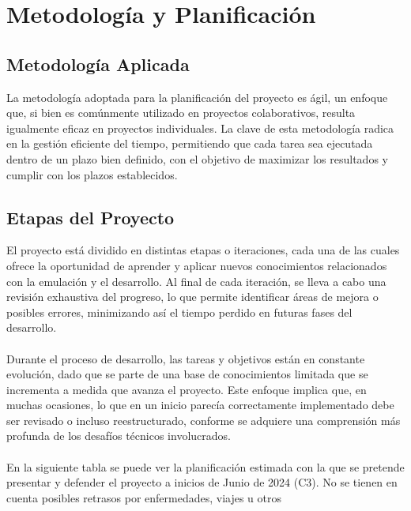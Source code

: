 \cleardoublepage

\chapter{Metodología y Planificación}
\label{planificacion}
\section{Metodología Aplicada}
La metodología adoptada para la planificación del proyecto es ágil, un enfoque que, si bien es comúnmente utilizado en proyectos colaborativos, resulta igualmente eficaz en proyectos individuales. La clave de esta metodología radica en la gestión eficiente del tiempo, permitiendo que cada tarea sea ejecutada dentro de un plazo bien definido, con el objetivo de maximizar los resultados y cumplir con los plazos establecidos.
\section{Etapas del Proyecto}
El proyecto está dividido en distintas etapas o iteraciones, cada una de las cuales ofrece la oportunidad de aprender y aplicar nuevos conocimientos relacionados con la emulación y el desarrollo. Al final de cada iteración, se lleva a cabo una revisión exhaustiva del progreso, lo que permite identificar áreas de mejora o posibles errores, minimizando así el tiempo perdido en futuras fases del desarrollo.
\\\\
Durante el proceso de desarrollo, las tareas y objetivos están en constante evolución, dado que se parte de una base de conocimientos limitada que se incrementa a medida que avanza el proyecto. Este enfoque implica que, en muchas ocasiones, lo que en un inicio parecía correctamente implementado debe ser revisado o incluso reestructurado, conforme se adquiere una comprensión más profunda de los desafíos técnicos involucrados.
\\\\
En la siguiente tabla se puede ver la planificación estimada con la que se pretende presentar y defender el proyecto a inicios de Junio de 2024 (C3). No se tienen en cuenta posibles retrasos por enfermedades, viajes u otros


